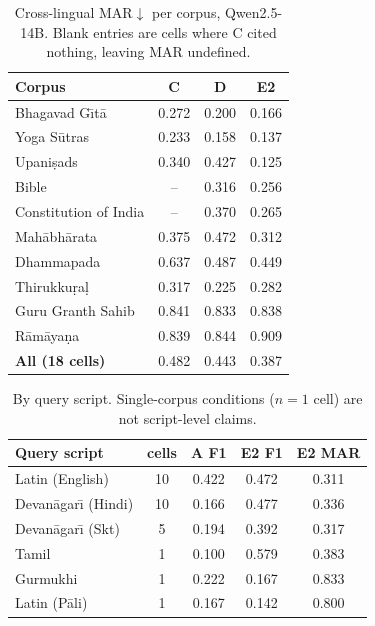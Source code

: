 \documentclass[11pt]{article}
\begin{document}
\begin{table}[h]
\centering\small
\begin{tabular}{@{}lccc@{}}
\toprule
\textbf{Corpus} & \textbf{C} & \textbf{D} & \textbf{E2} \\
\midrule
Bhagavad G\={\i}t\={a} & 0.272 & 0.200 & 0.166 \\
Yoga S\={u}tras & 0.233 & 0.158 & 0.137 \\
Upani\d{s}ads & 0.340 & 0.427 & 0.125 \\
Bible & -- & 0.316 & 0.256 \\
Constitution of India & -- & 0.370 & 0.265 \\
Mah\={a}bh\={a}rata & 0.375 & 0.472 & 0.312 \\
Dhammapada & 0.637 & 0.487 & 0.449 \\
Thirukku\d{r}a\d{l} & 0.317 & 0.225 & 0.282 \\
Guru Granth Sahib & 0.841 & 0.833 & 0.838 \\
R\={a}m\={a}ya\d{n}a & 0.839 & 0.844 & 0.909 \\
\midrule
\textbf{All (18 cells)} & 0.482 & 0.443 & 0.387 \\
\bottomrule
\end{tabular}
\caption{Cross-lingual MAR$\downarrow$ per corpus, Qwen2.5-14B. Blank entries are
cells where C cited nothing, leaving MAR undefined.}
\end{table}

\begin{table}[h]
\centering\small
\begin{tabular}{@{}lcccc@{}}
\toprule
\textbf{Query script} & \textbf{cells} & \textbf{A F1} & \textbf{E2 F1} & \textbf{E2 MAR} \\
\midrule
Latin (English) & 10 & 0.422 & 0.472 & 0.311 \\
Devan\={a}gar\={\i} (Hindi) & 10 & 0.166 & 0.477 & 0.336 \\
Devan\={a}gar\={\i} (Skt) & 5 & 0.194 & 0.392 & 0.317 \\
Tamil & 1 & 0.100 & 0.579 & 0.383 \\
Gurmukhi & 1 & 0.222 & 0.167 & 0.833 \\
Latin (P\={a}li) & 1 & 0.167 & 0.142 & 0.800 \\
\bottomrule
\end{tabular}
\caption{By query script. Single-corpus conditions ($n=1$ cell) are not
script-level claims.}
\end{table}
\end{document}
